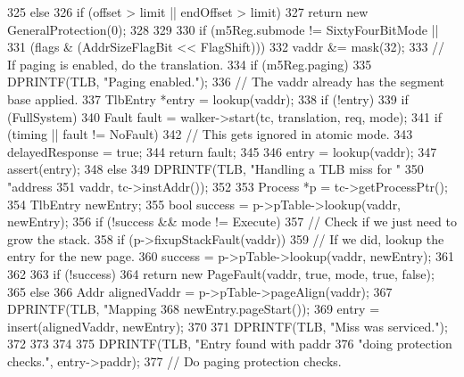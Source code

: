 \begin{DoxyCode}
{{{{325             } else {
326                 if (offset > limit || endOffset > limit)
327                     return new GeneralProtection(0);
328             }
329         }
330         if (m5Reg.submode != SixtyFourBitMode ||
331                 (flags & (AddrSizeFlagBit << FlagShift)))
332             vaddr &= mask(32);
333         // If paging is enabled, do the translation.
334         if (m5Reg.paging) {
335             DPRINTF(TLB, "Paging enabled.\n");
336             // The vaddr already has the segment base applied.
337             TlbEntry *entry = lookup(vaddr);
338             if (!entry) {
339                 if (FullSystem) {
340                     Fault fault = walker->start(tc, translation, req, mode);
341                     if (timing || fault != NoFault) {
342                         // This gets ignored in atomic mode.
343                         delayedResponse = true;
344                         return fault;
345                     }
346                     entry = lookup(vaddr);
347                     assert(entry);
348                 } else {
349                     DPRINTF(TLB, "Handling a TLB miss for "
350                             "address %
351                             vaddr, tc->instAddr());
352 
353                     Process *p = tc->getProcessPtr();
354                     TlbEntry newEntry;
355                     bool success = p->pTable->lookup(vaddr, newEntry);
356                     if (!success && mode != Execute) {
357                         // Check if we just need to grow the stack.
358                         if (p->fixupStackFault(vaddr)) {
359                             // If we did, lookup the entry for the new page.
360                             success = p->pTable->lookup(vaddr, newEntry);
361                         }
362                     }
363                     if (!success) {
364                         return new PageFault(vaddr, true, mode, true, false);
365                     } else {
366                         Addr alignedVaddr = p->pTable->pageAlign(vaddr);
367                         DPRINTF(TLB, "Mapping %
368                                 newEntry.pageStart());
369                         entry = insert(alignedVaddr, newEntry);
370                     }
371                     DPRINTF(TLB, "Miss was serviced.\n");
372                 }
373             }
374 
375             DPRINTF(TLB, "Entry found with paddr %
376                     "doing protection checks.\n", entry->paddr);
377             // Do paging protection checks.
}}}
\end{DoxyCode}
